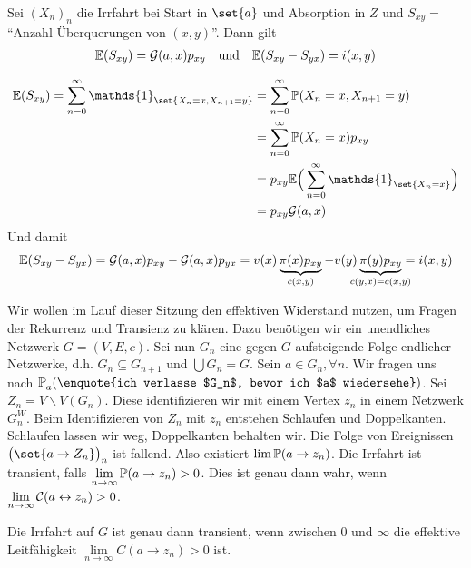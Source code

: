 \begin{satz}
	Sei $(X_n)_n$ die Irrfahrt bei Start in $\set{a}$ und Absorption in $Z$ und $S_{xy} = $\enquote{Anzahl Überquerungen von $(x,y)$}. Dann gilt
	\begin{align}
		\EW{S_{xy}} = \greens{a,x}p_{xy} && \text{und} && \EW{S_{xy} - S_{yx}} =i(x,y) 
	\end{align}
\end{satz}
\begin{beweis}
	\begin{align}
		\EW{S_{xy}} = \sum\limits_{n=0}^{\infty} \mathds{1}_{\set{X_n=x,X_{n+1}=y}} &= \sum\limits_{n=0}^{\infty}\prop{X_n =x,X_{n+1} = y} \\
		&= \sum\limits_{n=0}^{\infty} \prop{X_n = x}p_{xy} \\
		&= p_{xy} \EW{\relax}\Big(\sum\limits_{n = 0}^{\infty} \mathds{1}_{\set{X_n = x}}\Big) \\
		&= p_{xy}\greens{a,x}
	\end{align}
	Und damit 
	\begin{align}
		\EW{S_{xy} - S_{yx}} = \greens{a,x}p_{xy} - \greens{a,x}p_{yx} = v(x) \underbrace{\pi(x)p_{xy}}_{\mathclap{c(x,y)}} - v(y) \underbrace{\pi(y)p_{xy}}_{\mathclap{c(y,x)=c(x,y)}} = i(x,y)
	\end{align}
\end{beweis}
Wir wollen im Lauf dieser Sitzung den effektiven Widerstand nutzen, um Fragen der Rekurrenz und Transienz zu klären. Dazu benötigen wir ein unendliches Netzwerk $G = (V,E,c)$. Sei  nun $G_n$ eine gegen $G$ aufsteigende Folge endlicher Netzwerke, d.h. $G_n \subseteq G_{n+1}$ und $\bigcup G_n = G$. Sein $a \in G_n, \forall n$. Wir fragen uns nach $\prop{\text{\enquote{ich verlasse $G_n$, bevor ich $a$ wiedersehe}}}[][a]$.
Sei $Z_n = V \backslash V(G_n)$. Diese identifizieren wir mit einem Vertex $z_n$ in einem Netzwerk $G^W_n$.  Beim Identifizieren von $Z_n$ mit $z_n$ entstehen Schlaufen und Doppelkanten. Schlaufen lassen wir weg, Doppelkanten behalten wir. Die Folge von Ereignissen $\big(\set{a \to Z_n}\big)_n$ ist fallend. Also existiert $\lim \prop{a \to z_n}$. Die Irrfahrt ist transient, falls $\lim\limits_{n \to \infty} \prop{a \to z_n} > 0$. Dies ist genau dann wahr, wenn $\lim\limits_{n \to \infty} \leit{a \leftrightarrow z_n} > 0$.

\begin{satz}
	Die Irrfahrt auf $G$ ist genau dann transient, wenn zwischen $0$ und $\infty$ die effektive Leitfähigkeit  $\lim\limits_{n \to \infty} C(a \to z_n) > 0$ ist. 
\end{satz}

